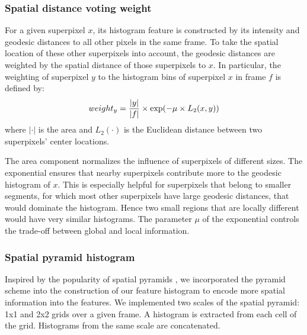 \documentclass[runningheads]{llncs}
\begin{document}
\subsubsection{Spatial distance voting weight}
For a given superpixel $x$, its histogram feature is constructed by its intensity and geodesic distances to all other pixels in the same frame. To take the spatial location of these other superpixels into account, the geodesic distances are weighted by the spatial distance of those superpixels to $x$. In particular, the weighting of superpixel $y$ to the histogram bins of superpixel $x$ in frame $f$ is defined by:
\begin{equation}
weight_y = {|y| \over |f| }\times \exp({-\mu \times L_2(x,y) })
\end{equation}
where $|\cdot|$ is the area and $L_2(\cdot)$ is the Euclidean distance between two superpixels' center locations. 

The area component normalizes the influence of superpixels of different sizes.
The exponential ensures that nearby superpixels contribute more to the geodesic histogram of $x$. This is especially helpful for superpixels that belong to smaller segments, for which most other superpixels have large geodesic distances, that would dominate the histogram. Hence two small regions that are locally different would have very similar histograms. The parameter $\mu$ of the exponential controls the trade-off between global and local information. 

\subsubsection{Spatial pyramid histogram}
Inspired by the popularity of spatial pyramids \cite{1641019}, we incorporated the pyramid scheme into the construction of our feature histogram to encode more spatial information into the features. We implemented two scales of the spatial pyramid: 1x1 and 2x2 grids over a given frame. A histogram is extracted from each cell of the grid. Histograms from the same scale are concatenated.


\end{document}
